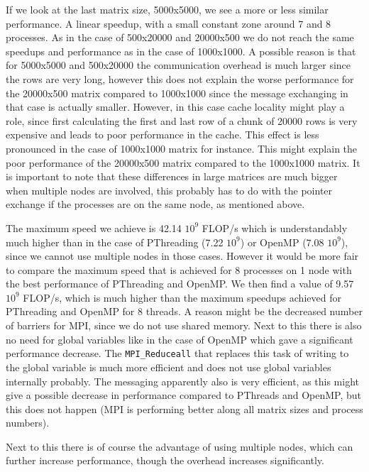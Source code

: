 \documentclass[11pt,a4paper,onecolumn]{article}
\begin{document}
If we look at the last matrix size, 5000x5000, we see a more or less similar performance. A linear speedup, with a small constant zone around 7 and 8 processes. As in the case of 500x20000 and 20000x500 we do not reach the same speedups and performance as in the case of 1000x1000. A possible reason is that for 5000x5000 and 500x20000 the communication overhead is much larger since the rows are very long, however this does not explain the worse performance for the 20000x500 matrix compared to 1000x1000 since the message exchanging in that case is actually smaller. However, in this case cache locality might play a role, since first calculating the first and last row of a chunk of 20000 rows is very expensive and leads to poor performance in the cache. This effect is less pronounced in the case of 1000x1000 matrix for instance. This might explain the poor performance of the 20000x500 matrix compared to the 1000x1000 matrix. It is important to note that these differences in large matrices are much bigger when multiple nodes are involved, this probably has to do with the pointer exchange if the processes are on the same node, as mentioned above.

The maximum speed we achieve is 42.14 $10^9$ FLOP/s which is understandably much higher than in the case of PThreading (7.22 $10^9$) or OpenMP (7.08 $10^9$), since we cannot use multiple nodes in those cases. However it would be more fair to compare the maximum speed that is achieved for 8 processes on 1 node with the best performance of PThreading and OpenMP. We then find a value of 9.57 $10^9$ FLOP/s, which is much higher than the maximum speedups achieved for PThreading and OpenMP for 8 threads. A reason might be the decreased number of barriers for MPI, since we do not use shared memory. Next to this there is also no need for global variables like in the case of OpenMP which gave a significant performance decrease. The \texttt{MPI\_Reduceall} that replaces this task of writing to the global variable is much more efficient and does not use global variables internally probably. The messaging apparently also is very efficient, as this might give a possible decrease in performance compared to PThreads and OpenMP, but this does not happen (MPI is performing better along all matrix sizes and process numbers).

Next to this there is of course the advantage of using multiple nodes, which can further increase performance, though the overhead increases significantly.  
\end{document}
